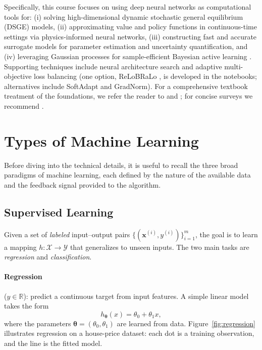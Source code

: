 \documentclass[11pt,a4paper]{report}
\newcommand{\x}{\bm{x}}
\newcommand{\R}{\mathbb{R}}
\begin{document}
Specifically, this course focuses on using deep neural networks as computational tools for:  (i) solving high-dimensional dynamic stochastic general equilibrium (DSGE) models, (ii) approximating value and policy functions in continuous-time settings via physics-informed neural networks, (iii) constructing fast and accurate surrogate models for parameter estimation and uncertainty quantification, and (iv) leveraging Gaussian processes for sample-efficient Bayesian active learning \citep{azinovicDEEPEQUILIBRIUMNETS2022, friedlDeep2023, chen2025Deep}.  Supporting techniques include neural architecture search and adaptive multi-objective loss balancing (one option, ReLoBRaLo \citep{bischof2025relobralo}, is developed in the notebooks; alternatives include SoftAdapt and GradNorm).  For a comprehensive textbook treatment of the foundations, we refer the reader to \citet{goodfellow2016deep} and \citet{chollet2017deeplearning}; for concise surveys we recommend \citet{lecun2015deep}.

\section{Types of Machine Learning}

Before diving into the technical details, it is useful to recall the three broad paradigms of machine learning, each defined by the nature of the available data and the feedback signal provided to the algorithm.

\subsection{Supervised Learning}

Given a set of \emph{labeled} input--output pairs $\{(\x^{(i)}, y^{(i)})\}_{i=1}^{m}$, the goal is to learn a mapping $h:\mathcal{X}\to\mathcal{Y}$ that generalizes to unseen inputs.  The two main tasks are \emph{regression} and \emph{classification}.

\paragraph{Regression} ($y \in \R$): predict a continuous target from input features.  A simple linear model takes the form
\[
    h_{\bm{\theta}}(x) = \theta_0 + \theta_1 x,
\]
where the parameters $\bm{\theta} = (\theta_0, \theta_1)$ are learned from data.  Figure~\ref{fig:regression} illustrates regression on a house-price dataset: each dot is a training observation, and the line is the fitted model.
\end{document}
